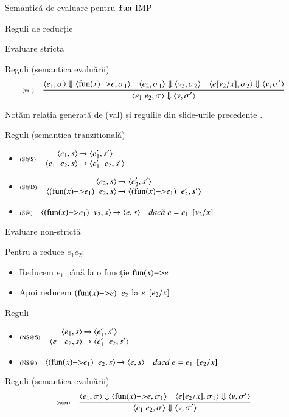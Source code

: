 \documentclass[xcolor=pdftex,romanian,colorlinks]{beamer}
\begin{document}
\begin{section}{Semantică de evaluare pentru $\mathrel{\text{\ttfamily fun}}$-IMP}
\begin{subsection}{Reguli de reducție}
\begin{frame}{Evaluare strictă}
\begin{overprint}
\begin{block}{Reguli (semantica evaluării)}
\[\reg[val]{\S{\c{e_1\mathrel e_2,\sigma}}{\c{v,\sigma'}}}{\S{\c{e_1,\sigma}}{\c{\fun{x}{e},\sigma_1}} \si \S{\c{e_2,\sigma_1}}{\c{v_2,\sigma_2}} \si \S{\c{e[v_2/x],\sigma_2}}{\c{v,\sigma'}}}{}\]

Notăm relația generată de ({\sc val}) și regulile din slide-urile precedente . 
\end{block}
\begin{block}{Reguli (semantica tranzitională)}
\begin{itemize}
\item[]$\reg[S@S]{\Ss{\c{e_1\mathrel{}e_2,s}}{\c{e_1'\mathrel{}e_2,s'}}}{\Ss{\c{e_1,s}}{\c{e_1',s'}}}{}$
\item[]$\reg[S@D]{\Ss{\c{(\fun{x}{e_1})\mathrel{}e_2,s}}{\c{(\fun{x}{e_1})\mathrel{}e_2',s'}}}{\Ss{\c{e_2,s}}{\c{e_2',s'}}}{}$
\item[]$\reg[S@]{\Ss{\c{(\fun{x}{e_1})\mathrel{}v_2,s}}{\c{e,s}}}{}{e = \substapp{e_1}{\subst{\substpair{v_2}{x}}}}$
\end{itemize}
\end{block}
\end{overprint}
\end{frame}

\begin{frame}{Evaluare non-strictă} 
\begin{block}{}
Pentru a reduce $e_1 \mathrel{} e_2$:
\begin{itemize}
\item  Reducem $e_1$ până la o funcție $\fun{x}{e}$ 
\item Apoi reducem $(\fun{x}{e}) \mathrel{}e_2$ la $e\mathbin{}[e_2/x]$
\end{itemize}
\end{block}

\begin{overprint}
\begin{block}{Reguli}
\begin{itemize}
\item[]$\reg[NS@S]{\Ss{\c{e_1\mathrel{}e_2,s}}{\c{e_1'\mathrel{}e_2,s'}}}{\Ss{\c{e_1,s}}{\c{e_1',s'}}}{}$
\item[]$\reg[NS@]{\Ss{\c{(\fun{x}{e_1})\mathrel{}e_2,s}}{\c{e,s}}}{}{e = \substapp{e_1}{\subst{\substpair{e_2}{x}}}}$
\end{itemize}
\end{block}
\begin{block}{Reguli (semantica evaluării)}
\[\reg[num]{\S{\c{e_1\mathrel e_2,\sigma}}{\c{v,\sigma'}}}{\S{\c{e_1,\sigma}}{\c{\fun{x}{e},\sigma_1}} \si \S{\c{e[e_2/x],\sigma_1}}{\c{v,\sigma'}}}{}\]


\end{block}
\end{overprint}
\end{frame}
\end{subsection}
\end{section}
\end{document}
